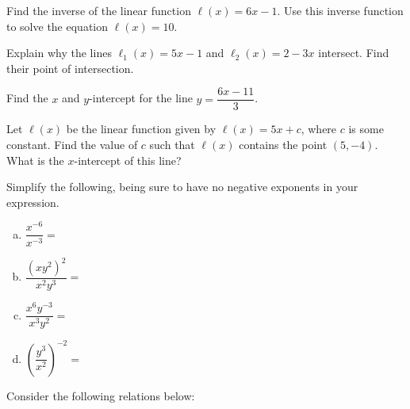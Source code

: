\documentclass[11pt,letterpaper]{article}
\begin{document}
\prob Find the inverse of the linear function $\ell(x)= 6x - 1$. Use this inverse function to solve the equation $\ell(x)= 10$. \pspace


\prob Explain why the lines $\ell_1(x)= 5x - 1$ and $\ell_2(x)= 2 - 3x$ intersect. Find their point of intersection. \pspace


\prob Find the $x$ and $y$-intercept for the line $y= \dfrac{6x - 11}{3}$. \pspace


\prob Let $\ell(x)$ be the linear function given by $\ell(x)= 5x + c$, where $c$ is some constant. Find the value of $c$ such that $\ell(x)$ contains the point $(5, -4)$. What is the $x$-intercept of this line? \pspace


\prob Simplify the following, being sure to have no negative exponents in your expression. \pspace
\begin{enumerate}[(a)]
\item $\dfrac{x^{-6}}{x^{-3}}=$ 
\item $\dfrac{(xy^2)^2}{x^2 y^3}=$ 
\item $\dfrac{x^6 y^{-3}}{x^3 y^2}=$ 
\item $\left( \dfrac{y^3}{x^2} \right)^{-2}=$ 
\end{enumerate} \pspace


\prob Consider the following relations below:
\end{document}
